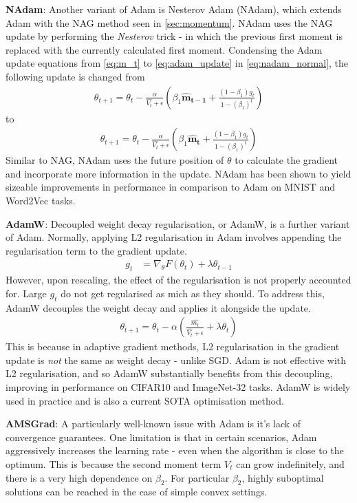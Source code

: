 \textbf{NAdam}: Another variant of Adam is Nesterov Adam (NAdam), which extends Adam with the NAG method seen in \cref{sec:momentum}. NAdam uses the NAG update by performing the \textit{Nesterov} trick - in which the previous first moment is replaced with the currently calculated first moment. Condensing the Adam update equations from \cref{eq:m_t} to \cref{eq:adam_update} in \cref{eq:nadam_normal}, the following update is changed from 
\begin{align}
    \theta_{t+1} = \theta_t - \frac{\alpha}{{\hat{V_t}} + \epsilon} (\beta_1 \mathbf{\hat{m}_{t-1}} + \frac{(1 - \beta_1)g_t}{1 - (\beta_1)^t}) \label{eq:nadam_normal}
\end{align}
to 
\begin{align}
    \theta_{t+1} = \theta_t - \frac{\alpha}{{\hat{V_t}} + \epsilon} (\beta_1 \mathbf{\hat{m}_{t}} + \frac{(1 - \beta_1)g_t}{1 - (\beta_1)^t})
\end{align}
Similar to NAG, NAdam uses the future position of $\theta$ to calculate the gradient and incorporate more information in the update. NAdam has been shown to yield sizeable improvements in performance in comparison to Adam on MNIST and Word2Vec tasks.

\textbf{AdamW}: Decoupled weight decay regularisation, or AdamW, is a further variant of Adam. Normally, applying L2 regularisation in Adam involves appending the regularisation term to the gradient update.
\begin{align}
    g_t &= \nabla_{\theta} F(\theta_t) + \lambda \theta_{t-1}
\end{align}
However, upon rescaling, the effect of the regularisation is not properly accounted for. Large $g_t$ do not get regularised as mich as they should. To address this, AdamW decouples the weight decay and applies it alongside the update.
\begin{align}
    \theta_{t+1} = \theta_t - \alpha \left( \frac{\hat{m_t}}{\hat{V_t} + \epsilon} + \lambda \theta_t \right)
\end{align}
This is because in adaptive gradient methods, L2 regularisation in the gradient update is \textit{not} the same as weight decay - unlike SGD. Adam is not effective with L2 regularisation, and so AdamW substantially benefits from this decoupling, improving in performance on CIFAR10 and ImageNet-32 tasks. AdamW is widely used in practice and is also a current SOTA optimisation method.

\textbf{AMSGrad}: A particularly well-known issue with Adam is it's lack of convergence guarantees. One limitation is that in certain scenarios, Adam aggressively increases the learning rate - even when the algorithm is close to the optimum. This is because the second moment term $V_t$ can grow indefinitely, and there is a very high dependence on $\beta_2$. For particular $\beta_2$, highly suboptimal solutions can be reached in the case of simple convex settings.

